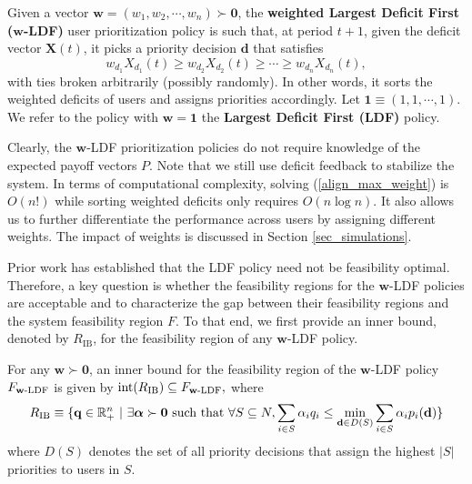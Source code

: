 \documentclass[prodmode,acmtompecs]{acmsmall}
\newcommand{\reqvec}{\mathbf{q}}
\newcommand{\reqscalar}{q}
\newcommand{\ribvec}{\boldsymbol{\alpha}}
\newcommand{\ribscalar}{\alpha}
\newcommand{\feasibilityRegion}{F}
\newcommand{\fullUserSet}{N}
\newcommand{\myComments}[1]{}
\newif\ifdissertation
\newcommand{\dissertationStart}{\ifdissertation  \myComments{Dissertation version: }}
\newcommand{\commentEnd}{\myComments{End}}
\begin{document}
\begin{definition}
\label{defn_w_LDF}
Given a vector $\mathbf{w} = (w_1, w_2, \cdots, w_n) \succ \mathbf{0}$, the {\bf weighted Largest Deficit First ($\mathbf{w}$-LDF)} user prioritization policy is such that, at period $t+1$, given the deficit vector $\mathbf{X}(t)$, it picks a priority decision $\mathbf{d}$ that satisfies
$$
w_{d_1}X_{d_1}(t) \geq w_{d_2}X_{d_2}(t) \geq \cdots \geq w_{d_n}X_{d_n}(t),
$$
with ties broken arbitrarily (possibly randomly). In other words, it sorts the weighted deficits of users and assigns priorities accordingly. 
Let $\mathbf{1} \equiv (1, 1, \cdots, 1)$. 
We refer to the policy with $\mathbf{w} = \mathbf{1}$ the {\bf Largest Deficit First (LDF)} policy. 
\end{definition}

\dissertationStart
The LDF policy has been explored before \cite{DiW06, JLS07, KWJ13} in the context of specific resource, workload and payoff models. We also generalize it to a class of policies with different weight vectors and provide better geometric characterization of the feasibility region. 
\commentEnd\fi

Clearly, the $\mathbf{w}$-LDF prioritization policies do not require knowledge of the expected payoff vectors $P$.
Note that we still use deficit feedback to stabilize the system. 
In terms of computational complexity, solving (\ref{align_max_weight}) is $O(n!)$ while sorting weighted deficits only requires $O(n\log n)$. 
It also allows us to further differentiate the performance across users by assigning different weights. The impact of weights is discussed in Section \ref{sec_simulations}. 

Prior work has established that the LDF policy need not be feasibility optimal. Therefore, a key question is whether the feasibility regions for the $\mathbf{w}$-LDF policies are acceptable and to characterize the gap between their feasibility regions and the system feasibility region $\feasibilityRegion$. 
To that end, we first provide an inner bound, denoted by $R_{\text{IB}}$, for the feasibility region of any $\mathbf{w}$-LDF policy. 

\begin{theorem}
\label{thm_R_IB}
For any $\mathbf{w} \succ \mathbf{0}$, an inner bound for the feasibility region of the $\mathbf{w}$-LDF policy $\feasibilityRegion_{\mathbf{w}\textnormal{-LDF}}$ is given by
$
\textnormal{int}(R_{\textnormal{IB}}) \subseteq \feasibilityRegion_{\mathbf{w}\textnormal{-LDF}}, 
$ 
where
\begin{align}
\label{align_R_IB_defn}
R_{\textnormal{IB}} \equiv \{\reqvec \in \mathbb R^n_{+} ~|~ \exists \ribvec \succ \mathbf{0} \text{ such that } \forall S\subseteq \fullUserSet, 
\sum\limits_{i\in S} \ribscalar_i {\reqscalar}_i \leq \min\limits_{\mathbf{d} \in D(S)} \sum\limits_{i\in S} {\ribscalar}_i p_i(\mathbf{d})
\}
\end{align}
where $D(S)$ denotes the set of all priority decisions that assign the highest $|S|$ priorities to users in $S$. 
\end{theorem}
\end{document}

